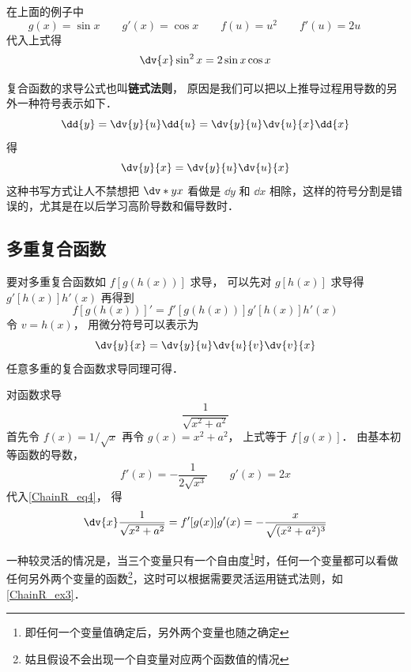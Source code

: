 在上面的例子中 
\begin{equation}
g(x) = \sin x \qquad
g'(x) = \cos x \qquad %
f(u) = u^2 \qquad
f'(u) = 2u \qquad
\end{equation}
代入上式得
\begin{equation}
\dv{x} \sin^2 x = 2\sin x \cos x
\end{equation}

复合函数的求导公式也叫\textbf{链式法则}， 原因是我们可以把以上推导过程用导数的另外一种符号表示如下．
\begin{equation}
\dd{y} = \dv{y}{u} \dd{u} = \dv{y}{u} \dv{u}{x} \dd{x}
\end{equation}
得
\begin{equation}
\dv{y}{x} = \dv{y}{u} \dv{u}{x}
\end{equation}
这种书写方式让人不禁想把 $\dv*{y}{x}$ 看做是 $\dd{y}$ 和 $\dd{x}$ 相除，这样的符号分割是错误的，尤其是在以后学习高阶导数和偏导数时．%

\subsection{多重复合函数}
要对多重复合函数如 $f[g(h(x))]$ 求导， 可以先对 $g[h(x)]$ 求导得 $g'[h(x)]h'(x)$ 再得到
\begin{equation}
f[g(h(x))]' = f'[g(h(x))]g'[h(x)]h'(x)
\end{equation}
令 $v = h(x)$， 用微分符号可以表示为
\begin{equation}
\dv{y}{x} = \dv{y}{u}\dv{u}{v}\dv{v}{x}
\end{equation}
任意多重的复合函数求导同理可得．

\begin{example}{对函数求导}
\begin{equation}
\frac{1}{\sqrt{x^2+a^2}}
\end{equation}
首先令 $f(x) = 1/\sqrt{x}$ 再令 $g(x) = x^2+a^2$， 上式等于 $f[g(x)]$． 由基本初等函数的导数，
\begin{equation}
f'(x) = -\frac{1}{2\sqrt{x^3}}  \qquad g'(x) = 2x
\end{equation}
代入\autoref{ChainR_eq4}， 得
\begin{equation}
\dv{x} \frac{1}{\sqrt{x^2+a^2}} =  f'[g(x)] g'(x) = -\frac{x}{\sqrt{(x^2+a^2)^3}}
\end{equation}
\end{example}

一种较灵活的情况是，当三个变量只有一个自由度\footnote{即任何一个变量值确定后，另外两个变量也随之确定}时，任何一个变量都可以看做任何另外两个变量的函数\footnote{姑且假设不会出现一个自变量对应两个函数值的情况}，这时可以根据需要灵活运用链式法则，如\autoref{ChainR_ex3}．

